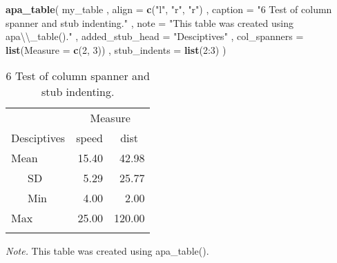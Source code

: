 \documentclass[english,man]{apa6}
\newenvironment{Shaded}{\begin{snugshade}}{\end{snugshade}}
\newcommand{\KeywordTok}[1]{\textcolor[rgb]{0.13,0.29,0.53}{\textbf{{#1}}}}
\newcommand{\DataTypeTok}[1]{\textcolor[rgb]{0.13,0.29,0.53}{{#1}}}
\newcommand{\DecValTok}[1]{\textcolor[rgb]{0.00,0.00,0.81}{{#1}}}
\newcommand{\CharTok}[1]{\textcolor[rgb]{0.31,0.60,0.02}{{#1}}}
\newcommand{\StringTok}[1]{\textcolor[rgb]{0.31,0.60,0.02}{{#1}}}
\newcommand{\NormalTok}[1]{{#1}}
\begin{document}
\begin{Shaded}
\begin{Highlighting}[]
\KeywordTok{apa_table}\NormalTok{(}
  \NormalTok{my_table}
  \NormalTok{, }\DataTypeTok{align =} \KeywordTok{c}\NormalTok{(}\StringTok{"l"}\NormalTok{, }\StringTok{"r"}\NormalTok{, }\StringTok{"r"}\NormalTok{)}
  \NormalTok{, }\DataTypeTok{caption =} \StringTok{"6 Test of column spanner and stub indenting."}
  \NormalTok{, }\DataTypeTok{note =} \StringTok{"This table was created using apa}\CharTok{\textbackslash{}\textbackslash{}}\StringTok{_table()."}
  \NormalTok{, }\DataTypeTok{added_stub_head =} \StringTok{"Desciptives"}
  \NormalTok{, }\DataTypeTok{col_spanners =} \KeywordTok{list}\NormalTok{(}\DataTypeTok{Measure =} \KeywordTok{c}\NormalTok{(}\DecValTok{2}\NormalTok{, }\DecValTok{3}\NormalTok{))}
  \NormalTok{, }\DataTypeTok{stub_indents =} \KeywordTok{list}\NormalTok{(}\DecValTok{2}\NormalTok{:}\DecValTok{3}\NormalTok{)}
\NormalTok{)}
\end{Highlighting}
\end{Shaded}

\begin{table}[tbp]
\begin{center}
\begin{threeparttable}
\caption{\label{tab:unnamed-chunk-5}6 Test of column spanner and stub indenting.}
\begin{tabular}{lrr}
\toprule
 & \multicolumn{2}{c}{Measure} \\
\cmidrule(r){2-3}
Desciptives & \multicolumn{1}{c}{speed} & \multicolumn{1}{c}{dist}\\
\midrule
Mean & 15.40 & 42.98\\
\ \ \ SD & 5.29 & 25.77\\
\ \ \ Min & 4.00 & 2.00\\
Max & 25.00 & 120.00\\
\bottomrule
\addlinespace
\end{tabular}
\begin{tablenotes}[para]
\textit{Note.} This table was created using apa\_table().
\end{tablenotes}
\end{threeparttable}
\end{center}
\end{table}
\end{document}
